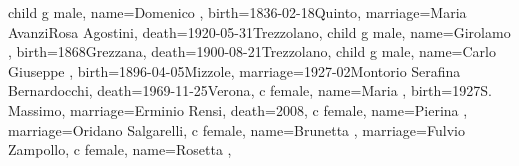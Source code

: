 \documentclass{article}
\begin{document}
\begin{midpage}
\begin{center}
\begin{genealogypicture}
{{{{{{{{{                                }
                                child{
                                    g{
                                        male,
                                        name={Domenico },
                                        birth={1836-02-18}{Quinto},
                                        marriage={Maria Avanzi}{Rosa Agostini},
                                        death={1920-05-31}{Trezzolano},
                                    }
                                    child{
                                        g{
                                            male,
                                            name={Girolamo },
                                            birth={1868}{Grezzana},
                                            death={1900-08-21}{Trezzolano},
                                        }
                                    }
                                    child{
                                        g{
                                            male,
                                            name={Carlo Giuseppe },
                                            birth={1896-04-05}{Mizzole},
                                            marriage={1927-02}{Montorio \newline Serafina Bernardocchi},
                                            death={1969-11-25}{Verona},
                                        }
                                        c{
                                            female,
                                            name={Maria },
                                            birth={1927}{S. Massimo},
                                            marriage={Erminio Rensi}{},
                                            death={2008}{},
                                        }
                                        c{
                                            female,
                                            name={Pierina },
                                            marriage={Oridano Salgarelli}{},
                                        }
                                        c{
                                            female,
                                            name={Brunetta },
                                            marriage={Fulvio Zampollo}{},
                                        }
                                        c{
                                            female,
                                            name={Rosetta },
}}}}}}}}}}}
\end{genealogypicture}
\end{center}
\end{midpage}
\end{document}
